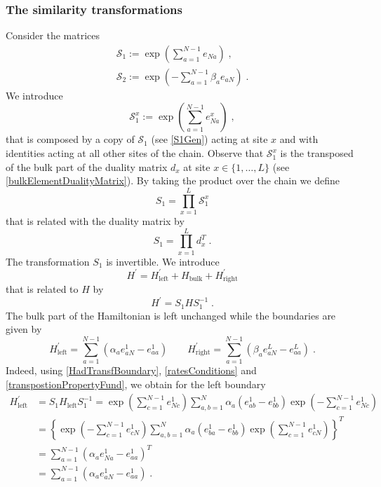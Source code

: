 \documentclass[10pt]{article}
\numberwithin{equation}{section}
\numberwithin{equation}{subsection}
\newcommand{\co}{\;,}
\newcommand{\dt}{\;.}
\begin{document}
\subsubsection{The similarity transformations}\label{subsectionSTransf}
Consider the matrices
\begin{align}
	\mathcal{S}_{1}:=\exp{\left(\sum_{a=1}^{N-1}e_{Na}\right)}\label{S1Gen}\co\\
	\mathcal{S}_{2}:=\exp{\left(-\sum_{a=1}^{N-1}\beta_{a}e_{aN}\right)}\dt\label{S2Gen}
\end{align}
We introduce
\begin{equation}\label{transformationV}
 \mathcal{S}_{1}^{x}:=\exp{\left(\sum_{a=1}^{N-1}e_{Na}^{x}\right)}\co %
\end{equation}
that is composed by a copy of $\mathcal{S}_{1}$ (see \eqref{S1Gen}) acting at site $x$ and with identities acting at all other sites of the chain. 
Observe that $\mathcal{S}_{1}^{x}$ is the transposed of the bulk part of the duality matrix $d_{x}$  at site $x\in \{1,\ldots,L\}$ (see \eqref{bulkElementDualityMatrix}). By taking the product over the chain we define
\begin{equation}\label{S1-Whole}
    S_{1}=\prod_{x=1}^{L}\mathcal{S}_{1}^{x}
\end{equation}
that is related with the duality matrix by 
\begin{equation}
S_{1}=\prod_{x=1}^{L}d_{x}^{T}\dt
\end{equation}
 The transformation $S_{1}$ is invertible. We introduce 
\begin{equation}\label{hatHamiltonian}
   H^{'}=H^{'}_{\text{left}}+H_{\text{bulk}}+H^{'}_{\text{right}}
\end{equation}
that is related to $H$ by
\begin{equation}\label{similarV}
   H^{'}=S_{1}HS_{1}^{-1}\dt
\end{equation}
The bulk part of the Hamiltonian is left unchanged while the boundaries are given by 
\begin{equation}
	H^{'}_{\text{left}}=\sum_{a=1}^{N-1}\left(\alpha_{a}e_{aN}^{1}-e_{aa}^{1}\right)\qquad H^{'}_{\text{right}}=\sum_{a=1}^{N-1}\left(\beta_{a}e_{aN}^{L}-e_{aa}^{L}\right)\dt
\end{equation}
Indeed, using \eqref{HadTransfBoundary}, \eqref{ratesConditions} and \eqref{transpostionPropertyFund}, we obtain for the left boundary
\begin{equation}
	\begin{split}
		H_{\text{left}}^{'}&=S_{1}H_{\text{left}}S_{1}^{-1}=\exp{\left(\sum_{c=1}^{N-1}e_{Nc}^{1}\right)}\sum_{a,b=1}^{N}\alpha_{a}\left(e_{ab}^{1}-e_{bb}^{1}\right)\exp{\left(-\sum_{c=1}^{N-1}e_{Nc}^{1}\right)}
		\\&=
		\left\{\exp{\left(-\sum_{c=1}^{N-1}e_{cN}^{1}\right)}\sum_{a,b=1}^{N}\alpha_{a}\left(e_{ba}^{1}-e_{bb}^{1}\right)\exp{\left(\sum_{c=1}^{N-1}e_{cN}^{1}\right)}\right\}^{T}
		\\&=
		\sum_{a=1}^{N-1}\left(\alpha_{a}e_{Na}^{1}-e_{aa}^{1}\right)^{T}
		\\&=
		\sum_{a=1}^{N-1}\left(\alpha_{a}e_{aN}^{1}-e_{aa}^{1}\right)\dt
	\end{split}
\end{equation}
\end{document}
